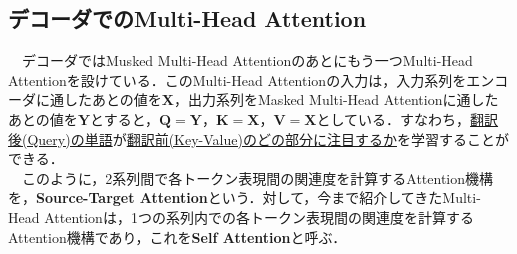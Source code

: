 \documentclass[a4j, 11pt]{jsarticle}
\numberwithin{equation}{section}
\begin{document}
\subsection{デコーダでのMulti-Head Attention}
　デコーダではMusked Multi-Head Attentionのあとにもう一つMulti-Head Attentionを設けている．このMulti-Head Attentionの入力は，入力系列をエンコーダに通したあとの値を$\mathbf{X}$，出力系列をMasked Multi-Head Attentionに通したあとの値を$\mathbf{Y}$とすると，$\mathbf{Q}=\mathbf{Y}，\mathbf{K}=\mathbf{X}，\mathbf{V}=\mathbf{X}$としている．すなわち，\uline{翻訳後(Query)の単語}が\uline{翻訳前(Key-Value)のどの部分に注目するか}を学習することができる．\\
　このように，2系列間で各トークン表現間の関連度を計算するAttention機構を，\textbf{Source-Target Attention}という．対して，今まで紹介してきたMulti-Head Attentionは，1つの系列内での各トークン表現間の関連度を計算するAttention機構であり，これを\textbf{Self Attention}と呼ぶ．\\
\end{document}
